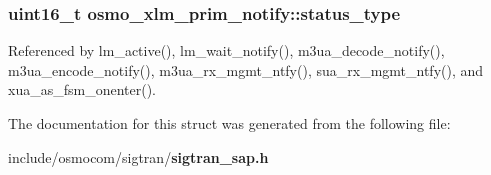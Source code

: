 \subsubsection[{status\+\_\+type}]{\setlength{\rightskip}{0pt plus 5cm}uint16\+\_\+t osmo\+\_\+xlm\+\_\+prim\+\_\+notify\+::status\+\_\+type}\label{structosmo__xlm__prim__notify_ab95e345b159e6875675733a07785e172}


Referenced by lm\+\_\+active(), lm\+\_\+wait\+\_\+notify(), m3ua\+\_\+decode\+\_\+notify(), m3ua\+\_\+encode\+\_\+notify(), m3ua\+\_\+rx\+\_\+mgmt\+\_\+ntfy(), sua\+\_\+rx\+\_\+mgmt\+\_\+ntfy(), and xua\+\_\+as\+\_\+fsm\+\_\+onenter().



The documentation for this struct was generated from the following file\+:\begin{DoxyCompactItemize}
\item 
include/osmocom/sigtran/{\bf sigtran\+\_\+sap.\+h}\end{DoxyCompactItemize}
